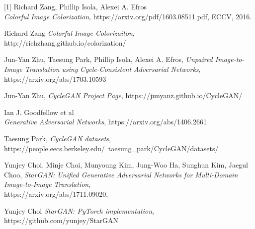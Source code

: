 \documentclass[12pt]{article}
\theoremstyle{definition}
\begin{document}
[1] Richard Zang, Phillip Isola, Alexei A. Efros \\ \textit {Colorful Image Colorization}, https://arxiv.org/pdf/1603.08511.pdf, ECCV, 2016. \par
[2] Richard Zang \textit {Colorful Image Colorizaiton}, http://richzhang.github.io/colorization/ \par
[3] Jun-Yan Zhu, Taesung Park, Phillip Isola, Alexei A. Efros, \textit {Unpaired Image-to-Image Translation using Cycle-Consistent Adversarial Networks}, https://arxiv.org/abs/1703.10593 \par
[4] Jun-Yan Zhu, \textit{CycleGAN Project Page}, https://junyanz.github.io/CycleGAN/ \par
[5] Ian J. Goodfellow et al \\ \textit{Generative Adversarial Networks}, https://arxiv.org/abs/1406.2661 \par
[6] Taesung Park, \textit{CycleGAN datasets}, \\ https://people.eecs.berkeley.edu/~taesung\_park/CycleGAN/datasets/ \par
[7] Yunjey Choi, Minje Choi, Munyoung Kim, Jung-Woo Ha, Sunghun Kim, Jaegul Choo, \textit{StarGAN: Unified Generative Adversarial Networks for Multi-Domain Image-to-Image Translation}, \\
https://arxiv.org/abs/1711.09020, \par
[8] Yunjey Choi \textit{StarGAN: PyTorch implementation}, \\
https://github.com/yunjey/StarGAN
\end{document}
